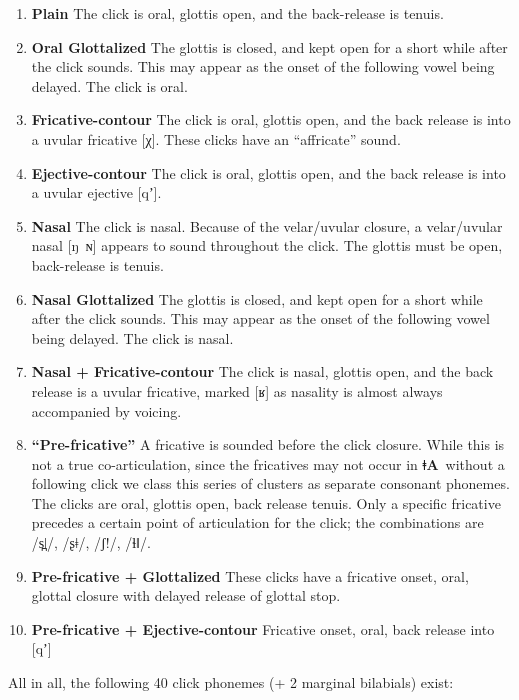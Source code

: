 \documentclass[11pt]{book}
\newcommand{\qcn}[1]{\textbf{#1}}
\newcommand{\langname}{\qcn{ǂA}~}
\begin{document}
\begin{enumerate}[I]
\item \textbf{Plain} The click is oral, glottis open, and the back-release is tenuis.
\item \textbf{Oral Glottalized} The glottis is closed, and kept open for a short while after the click sounds. This may appear as the onset of the following vowel being delayed. The click is oral.
\item \textbf{Fricative-contour} The click is oral, glottis open, and the back release is into a uvular fricative [χ]. These clicks have an ``affricate'' sound.
\item \textbf{Ejective-contour} The click is oral, glottis open, and the back release is into a uvular ejective [qʼ].
\item \textbf{Nasal} The click is nasal. Because of the velar/uvular closure, a velar/uvular nasal [ŋ~ɴ] appears to sound throughout the click. The glottis must be open, back-release is tenuis.
\item \textbf{Nasal Glottalized} The glottis is closed, and kept open for a short while after the click sounds. This may appear as the onset of the following vowel being delayed. The click is nasal.
\item \textbf{Nasal + Fricative-contour} The click is nasal, glottis open, and the back release is a uvular fricative, marked [ʁ] as nasality is almost always accompanied by voicing.
\item \textbf{``Pre-fricative''} A fricative is sounded before the click closure. While this is not a true co-articulation, since the fricatives may not occur in \langname without a following click we class this series of clusters as separate consonant phonemes. The clicks are oral, glottis open, back release tenuis. Only a specific fricative precedes a certain point of articulation for the click; the combinations are /s̪ǀ/, /ʂǂ/, /ʃ!/, /ɬǁ/.
\item \textbf{Pre-fricative + Glottalized} These clicks have a fricative onset, oral, glottal closure with delayed release of glottal stop.
\item \textbf{Pre-fricative + Ejective-contour} Fricative onset, oral, back release into [qʼ]
\end{enumerate}

All in all, the following 40 click phonemes (+ 2 marginal bilabials) exist:
\end{document}
